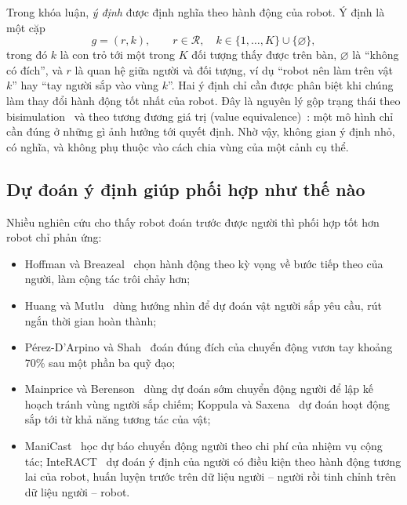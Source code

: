 Trong khóa luận, \emph{ý định} được định nghĩa theo hành động của robot. Ý định là một cặp
\begin{equation}
  g=(r,k),\qquad r\in\mathcal{R},\quad k\in\{1,\dots,K\}\cup\{\varnothing\},
  \label{eq:intent-def}
\end{equation}
trong đó $k$ là con trỏ tới một trong $K$ đối tượng thấy được trên bàn, $\varnothing$ là ``không có đích'', và $r$ là quan hệ giữa người và đối tượng, ví dụ ``robot nên làm trên vật $k$'' hay ``tay người sắp vào vùng $k$''. Hai ý định chỉ cần được phân biệt khi chúng làm thay đổi hành động tốt nhất của robot. Đây là nguyên lý gộp trạng thái theo bisimulation~\cite{givan2003equivalence,ferns2004metrics} và theo tương đương giá trị (value equivalence)~\cite{grimm2020value}: một mô hình chỉ cần đúng ở những gì ảnh hưởng tới quyết định. Nhờ vậy, không gian ý định nhỏ, có nghĩa, và không phụ thuộc vào cách chia vùng của một cảnh cụ thể.

\subsection{Dự đoán ý định giúp phối hợp như thế nào}

Nhiều nghiên cứu cho thấy robot đoán trước được người thì phối hợp tốt hơn robot chỉ phản ứng:
\begin{itemize}
  \item Hoffman và Breazeal~\cite{hoffman2007cost} chọn hành động theo kỳ vọng về bước tiếp theo của người, làm cộng tác trôi chảy hơn;
  \item Huang và Mutlu~\cite{huang2016anticipatory} dùng hướng nhìn để dự đoán vật người sắp yêu cầu, rút ngắn thời gian hoàn thành;
  \item Pérez-D'Arpino và Shah~\cite{perezdarpino2015fast} đoán đúng đích của chuyển động vươn tay khoảng 70\% sau một phần ba quỹ đạo;
  \item Mainprice và Berenson~\cite{mainprice2013human} dùng dự đoán sớm chuyển động người để lập kế hoạch tránh vùng người sắp chiếm; Koppula và Saxena~\cite{koppula2016anticipating} dự đoán hoạt động sắp tới từ khả năng tương tác của vật;
  \item ManiCast~\cite{kedia2023manicast} học dự báo chuyển động người theo chi phí của nhiệm vụ cộng tác; InteRACT~\cite{kedia2024interact} dự đoán ý định của người có điều kiện theo hành động tương lai của robot, huấn luyện trước trên dữ liệu người -- người rồi tinh chỉnh trên dữ liệu người -- robot.
\end{itemize}

